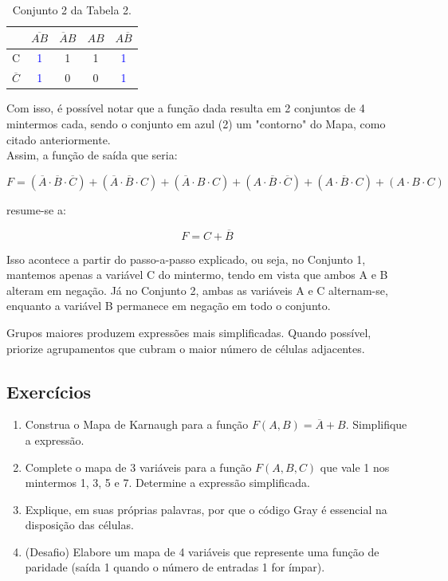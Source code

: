 \documentclass[12pt]{article}
\begin{document}
\begin{table}[H]
\centering
\begin{tabular}{|c|c|c|c|c|}
\hline
 & $\overline{AB}$ & $\overline{A}B$ & $AB$ & $A\overline{B}$ \\
\hline
C & \textcolor{blue}{1} & 1 & 1 & \textcolor{blue}{1} \\
\hline
$\overline{C}$ & \textcolor{blue}{1} & 0 & 0 & \textcolor{blue}{1} \\
\hline
\end{tabular}
\caption{Conjunto 2 da Tabela 2.}
\end{table}

Com isso, é possível notar que a função dada resulta em 2 conjuntos de 4 mintermos cada, sendo o conjunto em azul (2) um "contorno" do Mapa, como citado anteriormente. \\
Assim, a função de saída que seria: 

\[
F = (\overline{A} \cdot\overline{B} \cdot \overline{C})+(\overline{A}\cdot\overline{B}\cdot C)+(\overline{A}\cdot B \cdot C)+(A \cdot \overline{B} \cdot \overline{C})+(A \cdot \overline{B} \cdot C)+(A\cdot B\cdot C)
\]

resume-se a:
    
\[
F = C + \overline{B}
\]

Isso acontece a partir do passo-a-passo explicado, ou seja, no Conjunto 1, mantemos apenas a variável C do mintermo, tendo em vista que ambos A e B alteram em negação. Já no Conjunto 2, ambas as variáveis A e C alternam-se, enquanto a variável B permanece em negação em todo o conjunto.

\begin{tcolorbox}[mynote, title=\textbf{Observação}]
Grupos maiores produzem expressões mais simplificadas.  
Quando possível, priorize agrupamentos que cubram o maior número de células adjacentes.
\end{tcolorbox}

\subsection{Exercícios}

\begin{enumerate}
    \item Construa o Mapa de Karnaugh para a função \(F(A,B) = \overline{A} + B\). Simplifique a expressão.
    \item Complete o mapa de 3 variáveis para a função \(F(A,B,C)\) que vale 1 nos mintermos 1, 3, 5 e 7. Determine a expressão simplificada.
    \item Explique, em suas próprias palavras, por que o código Gray é essencial na disposição das células.
    \item (Desafio) Elabore um mapa de 4 variáveis que represente uma função de paridade (saída 1 quando o número de entradas 1 for ímpar).
\end{enumerate}
\end{document}
